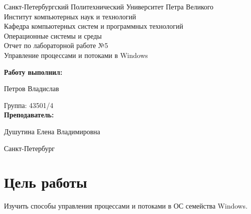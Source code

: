 \documentclass[a4paper]{article}
\begin{document}
\begin{titlepage} %

\begin{center} %

\large Санкт-Петербургский Политехнический Университет Петра Великого\\
\large Институт компьютерных наук и технологий \\
\large Кафедра компьютерных систем и программных технологий\\[6cm]

\huge Операционные системы и среды\\[0.5cm]
\large Отчет по лабораторной работе №5\\[0.1cm]
\large Управление процессами и потоками в Windows\\[5cm]
\end{center}

\begin{flushright}
\begin{minipage}{0.5\textwidth}
\begin{flushright}
\textbf{Работу выполнил:}

Петров Владислав

{Группа:} 43501/4\\


\textbf{Преподаватель:} 

Душутина Елена Владимировна
\end{flushright}
\end{minipage} %
\end{flushright} %

\vfill %

\begin{center}

\large Санкт-Петербург\\
\large \the\year %

\end{center} %

\thispagestyle{empty} %
\end{titlepage} %

\vfill %


\section{Цель работы}
	Изучить способы управления процессами и потоками в ОС семейства Windows.
	
\end{document}
